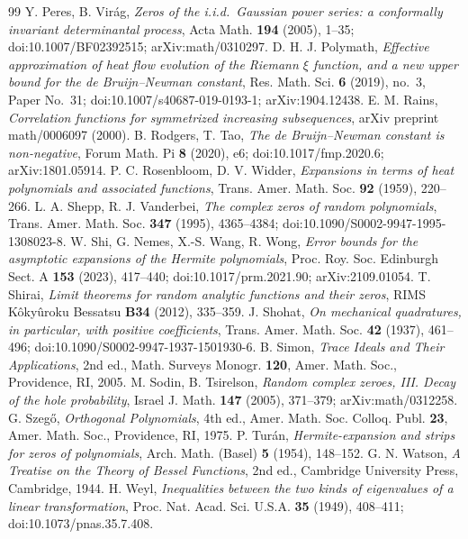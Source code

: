\documentclass[11pt]{amsart}
\theoremstyle{definition}
\theoremstyle{remark}
\numberwithin{equation}{section}
\begin{document}
\begin{thebibliography}{99}
 Y. Peres, B. Vir\'ag, \emph{Zeros of the i.i.d.\ Gaussian power series: a conformally invariant determinantal process}, Acta Math. \textbf{194} (2005), 1--35; doi:10.1007/BF02392515; arXiv:math/0310297.
 D. H. J. Polymath, \emph{Effective approximation of heat flow evolution of the Riemann $\xi$ function, and a new upper bound for the de Bruijn--Newman constant}, Res. Math. Sci. \textbf{6} (2019), no.~3, Paper No.~31; doi:10.1007/s40687-019-0193-1; arXiv:1904.12438.
 E. M. Rains, \emph{Correlation functions for symmetrized increasing subsequences}, arXiv preprint math/0006097 (2000).
 B. Rodgers, T. Tao, \emph{The de Bruijn--Newman constant is non-negative}, Forum Math. Pi \textbf{8} (2020), e6; doi:10.1017/fmp.2020.6; arXiv:1801.05914.
 P. C. Rosenbloom, D. V. Widder, \emph{Expansions in terms of heat polynomials and associated functions}, Trans. Amer. Math. Soc. \textbf{92} (1959), 220--266.
 L. A. Shepp, R. J. Vanderbei, \emph{The complex zeros of random polynomials}, Trans. Amer. Math. Soc. \textbf{347} (1995), 4365--4384; doi:10.1090/S0002-9947-1995-1308023-8.
 W. Shi, G. Nemes, X.-S. Wang, R. Wong, \emph{Error bounds for the asymptotic expansions of the Hermite polynomials}, Proc. Roy. Soc. Edinburgh Sect. A \textbf{153} (2023), 417--440; doi:10.1017/prm.2021.90; arXiv:2109.01054.
 T. Shirai, \emph{Limit theorems for random analytic functions and their zeros}, RIMS K\^oky\^uroku Bessatsu \textbf{B34} (2012), 335--359.
 J. Shohat, \emph{On mechanical quadratures, in particular, with positive coefficients}, Trans. Amer. Math. Soc. \textbf{42} (1937), 461--496; doi:10.1090/S0002-9947-1937-1501930-6.
 B. Simon, \emph{Trace Ideals and Their Applications}, 2nd ed., Math. Surveys Monogr. \textbf{120}, Amer. Math. Soc., Providence, RI, 2005.
 M. Sodin, B. Tsirelson, \emph{Random complex zeroes, III. Decay of the hole probability}, Israel J. Math. \textbf{147} (2005), 371--379; arXiv:math/0312258.
 G. Szeg\H{o}, \emph{Orthogonal Polynomials}, 4th ed., Amer. Math. Soc. Colloq. Publ. \textbf{23}, Amer. Math. Soc., Providence, RI, 1975.
 P. Tur\'an, \emph{Hermite-expansion and strips for zeros of polynomials}, Arch. Math. (Basel) \textbf{5} (1954), 148--152.
 G. N. Watson, \emph{A Treatise on the Theory of Bessel Functions}, 2nd ed., Cambridge University Press, Cambridge, 1944.
 H. Weyl, \emph{Inequalities between the two kinds of eigenvalues of a linear transformation}, Proc. Nat. Acad. Sci. U.S.A. \textbf{35} (1949), 408--411; doi:10.1073/pnas.35.7.408.
\end{thebibliography}
\end{document}
